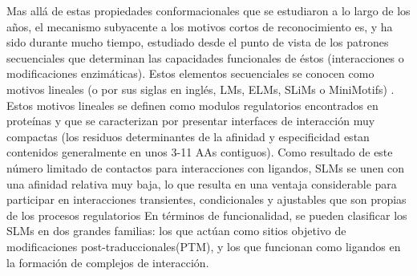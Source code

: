 Mas allá de estas propiedades conformacionales que se estudiaron a lo largo de los años, el mecanismo subyacente a los motivos cortos de reconocimiento es, y ha sido durante mucho tiempo, estudiado desde el punto de vista 
de los patrones secuenciales que determinan las capacidades funcionales de éstos (interacciones o modificaciones enzimáticas). Estos elementos secuenciales se conocen como motivos lineales (o por sus siglas en inglés, LMs, ELMs, SLiMs o MiniMotifs)
\cite{davey2012attributes}. Estos motivos lineales se definen como modulos regulatorios encontrados en proteínas y que se caracterizan por presentar interfaces
de interacción muy compactas (los residuos determinantes de la afinidad y especificidad estan contenidos generalmente en unos 3-11 AAs contiguos).
Como resultado de este número limitado de contactos para interacciones con ligandos, SLMs se unen con una afinidad relativa muy baja, lo que resulta en una ventaja considerable 
para participar en interacciones transientes, condicionales y  ajustables que son propias de los procesos regulatorios
En términos de funcionalidad, se pueden clasificar los SLMs en dos grandes familias: los que actúan como sitios objetivo de modificaciones post-traduccionales(PTM), 
y los que funcionan como ligandos en la formación de complejos de interacción.
